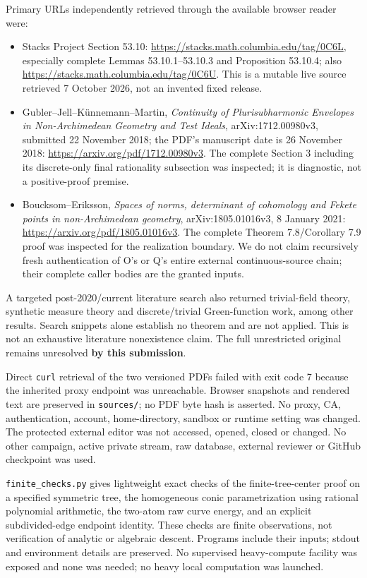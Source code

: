 \documentclass[
  11pt,
]{article}
\providecommand{\tightlist}{%
  \setlength{\itemsep}{0pt}\setlength{\parskip}{0pt}}
\begin{document}
Primary URLs independently retrieved through the available browser
reader were:

\begin{itemize}
\tightlist
\item
  Stacks Project Section 53.10:
  \url{https://stacks.math.columbia.edu/tag/0C6L}, especially complete
  Lemmas 53.10.1--53.10.3 and Proposition 53.10.4; also
  \url{https://stacks.math.columbia.edu/tag/0C6U}. This is a mutable
  live source retrieved 7 October 2026, not an invented fixed release.
\item
  Gubler--Jell--Künnemann--Martin, \emph{Continuity of Plurisubharmonic
  Envelopes in Non-Archimedean Geometry and Test Ideals},
  arXiv:1712.00980v3, submitted 22 November 2018; the PDF's manuscript
  date is 26 November 2018: \url{https://arxiv.org/pdf/1712.00980v3}.
  The complete Section 3 including its discrete-only final rationality
  subsection was inspected; it is diagnostic, not a positive-proof
  premise.
\item
  Boucksom--Eriksson, \emph{Spaces of norms, determinant of cohomology
  and Fekete points in non-Archimedean geometry}, arXiv:1805.01016v3, 8
  January 2021: \url{https://arxiv.org/pdf/1805.01016v3}. The complete
  Theorem 7.8/Corollary 7.9 proof was inspected for the realization
  boundary. We do not claim recursively fresh authentication of O's or
  Q's entire external continuous-source chain; their complete caller
  bodies are the granted inputs.
\end{itemize}

A targeted post-2020/current literature search also returned
trivial-field theory, synthetic measure theory and discrete/trivial
Green-function work, among other results. Search snippets alone
establish no theorem and are not applied. This is not an exhaustive
literature nonexistence claim. The full unrestricted original remains
unresolved \textbf{by this submission}.

Direct \texttt{curl} retrieval of the two versioned PDFs failed with
exit code 7 because the inherited proxy endpoint was unreachable.
Browser snapshots and rendered text are preserved in \texttt{sources/};
no PDF byte hash is asserted. No proxy, CA, authentication, account,
home-directory, sandbox or runtime setting was changed. The protected
external editor was not accessed, opened, closed or changed. No other
campaign, active private stream, raw database, external reviewer or
GitHub checkpoint was used.

\texttt{finite\_checks.py} gives lightweight exact checks of the
finite-tree-center proof on a specified symmetric tree, the homogeneous
conic parametrization using rational polynomial arithmetic, the two-atom
raw curve energy, and an explicit subdivided-edge endpoint identity.
These checks are finite observations, not verification of analytic or
algebraic descent. Programs include their inputs; stdout and environment
details are preserved. No supervised heavy-compute facility was exposed
and none was needed; no heavy local computation was launched.
\end{document}
